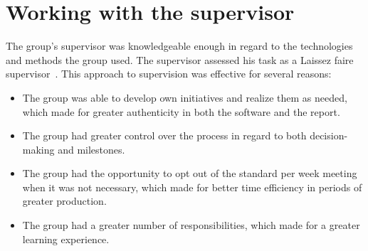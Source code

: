 \section{Working with the supervisor}\label{sec:working-with-the-supervisor}

The group's supervisor was knowledgeable enough in regard to the technologies and methods the group used.
The supervisor assessed his task as a Laissez faire supervisor~\cite{PBL}.
This approach to supervision was effective for several reasons:

\begin{itemize}
    \item The group was able to develop own initiatives and realize them as needed, which made for greater authenticity
    in both the software and the report.
    \item The group had greater control over the process in regard to both decision-making and milestones.
    \item The group had the opportunity to opt out of the standard per week meeting when it was not necessary, which
    made for better time efficiency in periods of greater production.
    \item The group had a greater number of responsibilities, which made for a greater learning experience.
\end{itemize}
